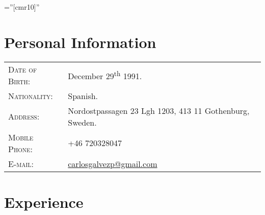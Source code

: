 \documentclass[a4paper,12pt]{article} %
\begin{document}
\pagestyle{empty} %

\font\fb=''[cmr10]'' %


\par{\bigskip\par} %

\section{Personal Information}

\begin{tabular}{R{4cm}l}
\textsc{Date of Birth:} & December 29\textsuperscript{th}  1991.  \\
\textsc{Nationality:} & Spanish. \\
\textsc{Address:} & Nordostpassagen 23 Lgh 1203, 413 11 Gothenburg, Sweden.\\
\textsc{Mobile Phone:} & +46 720328047\\
\textsc{E-mail:} & \href{mailto:carlosgalvezp@gmail.com}{carlosgalvezp@gmail.com}
\end{tabular}


\section{Experience}
\end{document}

